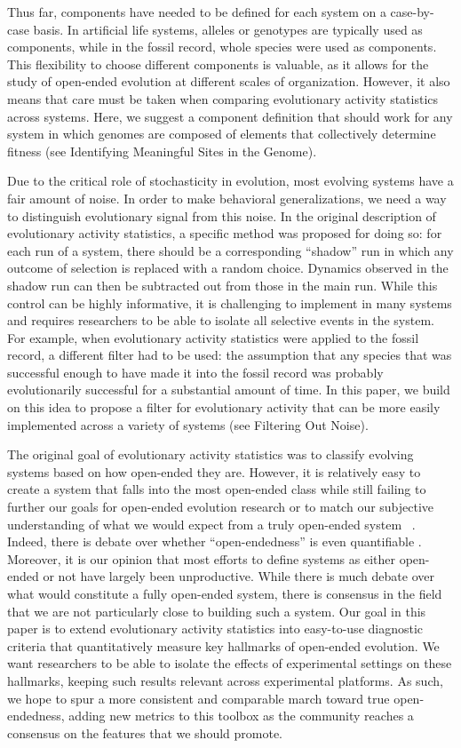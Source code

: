 \documentclass[letterpaper]{article}
\begin{document}
Thus far, components have needed to be defined for each system on a case-by-case basis.  In artificial life systems, alleles or genotypes are typically used as components, while in the fossil record, whole species were used as components. This flexibility to choose different components is valuable, as it allows for the study of open-ended evolution at different scales of organization. However, it also means that care must be taken when comparing evolutionary activity statistics across systems. Here, we suggest a component definition that should work for any system in which genomes are composed of elements that collectively determine fitness (see Identifying Meaningful Sites in the Genome).

Due to the critical role of stochasticity in evolution, most evolving systems have a fair amount of noise. In order to make behavioral generalizations, we need a way to distinguish evolutionary signal from this noise. In the original description of evolutionary activity statistics, a specific method was proposed for doing so: for each run of a system, there should be a corresponding ``shadow'' run in which any outcome of selection is replaced with a random choice. Dynamics observed in the shadow run can then be subtracted out from those in the main run. While this control can be highly informative, it is challenging to implement in many systems and requires researchers to be able to isolate all selective events in the system. For example, when evolutionary activity statistics were applied to the fossil record, a different filter had to be used: the assumption that any species that was successful enough to have made it into the fossil record was probably evolutionarily successful for a substantial amount of time. In this paper, we build on this idea to propose a filter for evolutionary activity that can be more easily implemented across a variety of systems (see Filtering Out Noise).


The original goal of evolutionary activity statistics was to classify evolving systems based on how open-ended they are. However, it is relatively easy to create a system that falls into the most open-ended class while still failing to further our goals for open-ended evolution research or to match our subjective understanding of what we would expect from a truly open-ended system ~\cite{maley_four_1999}. Indeed, there is debate over whether ``open-endedness'' is even quantifiable \citep{stanley_role_2016}. Moreover, it is our opinion that most efforts to define systems as either open-ended or not have largely been unproductive. While there is much debate over what would constitute a fully open-ended system, there is consensus in the field that we are not particularly close to building such a system. 
Our goal in this paper is to extend evolutionary activity statistics into easy-to-use diagnostic criteria that
quantitatively measure key hallmarks of open-ended evolution.  We want researchers to be able to isolate the effects of experimental settings on these hallmarks, keeping such results relevant across experimental platforms. As such, we hope to spur a more consistent and comparable march toward true open-endedness, adding new metrics to this toolbox as the community reaches a consensus on the features that we should promote.
\end{document}
